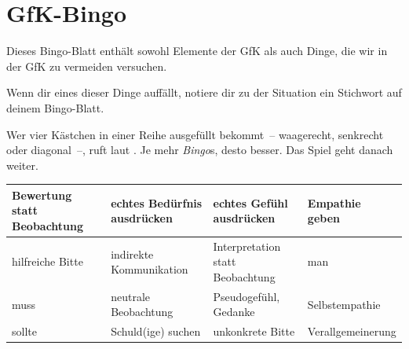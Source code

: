 \section{GfK-Bingo}

Dieses Bingo-Blatt enthält sowohl Elemente der GfK als auch Dinge, die wir in der GfK zu vermeiden versuchen.

Wenn dir eines dieser Dinge auffällt, notiere dir zu der Situation ein Stichwort auf deinem Bingo-Blatt.

Wer vier Kästchen in einer Reihe ausgefüllt bekommt~-- waagerecht, senkrecht oder diagonal~--, ruft laut . Je mehr \emph{Bingo}s, desto besser. Das Spiel geht danach weiter.

\hspace{1em}

\renewcommand{\arraystretch}{1.27}
\noindent\begin{tabular}{|p{10.0em}|p{10.0em}|p{10.0em}|p{10.0em}|}
             \hline

             Bewertung statt Beobachtung &
             echtes Bedürfnis ausdrücken &
             echtes Gefühl ausdrücken &
             Empathie geben \vspace{8em} \\
             \hline

             hilfreiche Bitte \vspace{8em} &
             indirekte Kommunikation &
             Interpretation statt Beobachtung &
             man \\
             \hline

             muss  \vspace{8em} &
             neutrale Beobachtung &
             Pseudogefühl, Gedanke &
             Selbstempathie \\
             \hline

             sollte \vspace{8em} &
             Schuld(ige) suchen &
             unkonkrete Bitte &
             Verallgemeinerung \\
             \hline
\end{tabular}
\renewcommand{\arraystretch}{1.0}
